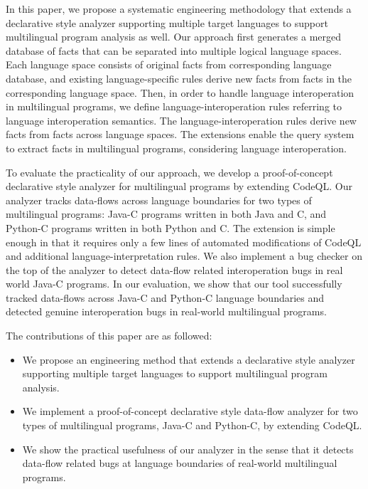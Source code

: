 In this paper, we propose a systematic engineering methodology that extends a
declarative style analyzer supporting multiple target languages to support
multilingual program analysis as well. Our approach first generates a merged
database of facts that can be separated into multiple logical language spaces.
Each language space consists of original facts from corresponding
language database, and existing language-specific rules derive new facts from
facts in the corresponding language space. Then, in order to handle language
interoperation in multilingual programs, we define language-interoperation
rules referring to language interoperation semantics. The
language-interoperation rules derive new facts from facts across language
spaces. The extensions enable the query system to extract facts in multilingual
programs, considering language interoperation.

To evaluate the practicality of our approach, we develop a proof-of-concept
declarative style analyzer for multilingual programs by extending CodeQL. Our
analyzer tracks data-flows across language boundaries for two types of
multilingual programs: Java-C programs written in both Java and C, and Python-C
programs written in both Python and C. The extension is simple enough in that
it requires only a few lines of automated modifications of CodeQL and additional
language-interpretation rules. We also implement a bug checker on the top of
the analyzer to detect data-flow related interoperation bugs in real world Java-C programs.
In our evaluation, we show that our tool successfully tracked data-flows across
Java-C and Python-C language boundaries and detected genuine interoperation
bugs in real-world multilingual programs.

The contributions of this paper are as followed:
\begin{itemize}
\item We propose an engineering method that extends a declarative style analyzer
supporting multiple target languages to support multilingual program analysis.

\item We implement a proof-of-concept declarative style data-flow analyzer for two
types of multilingual programs, Java-C and Python-C, by extending CodeQL.

\item We show the practical usefulness of our analyzer in the sense that it detects
data-flow related bugs at language boundaries of real-world multilingual
programs.
\end{itemize}
